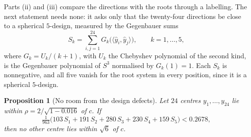 \documentclass[11pt,reqno]{amsart}
\renewcommand{\_}{\origunderscore\allowbreak}
\numberwithin{equation}{section}
\theoremstyle{plain}
\newtheorem{prop}[thm]{Proposition}
\theoremstyle{definition}
\theoremstyle{remark}
\begin{document}
Parts (ii) and (iii) compare the directions with the roots through a
labelling. The next statement needs none: it asks only that the twenty-four
directions be close to a spherical $5$-design, measured by the Gegenbauer
sums
\[
  S_k=\sum_{i,j=1}^{24}G_k\bigl(\langle\hat y_i,\hat y_j\rangle\bigr),\qquad
  k=1,\dots,5,
\]
where $G_k=U_k/(k+1)$, with $U_k$ the Chebyshev polynomial of the second kind,
is the Gegenbauer polynomial of $S^3$ normalised by $G_k(1)=1$. Each $S_k$ is
nonnegative, and all five vanish for the root system in every position,
since it is a spherical $5$-design.

\begin{prop}[No room from the design defects]\label{prop:design-budget}
Let $24$ centres $y_1,\dots,y_{24}$ lie within $\rho=2/\sqrt{1-0.016}$ of
$c$. If
\[
  \tfrac1{963}\bigl(103\,S_1+191\,S_2+280\,S_3+230\,S_4+159\,S_5\bigr)<0.2678,
\]
then no other centre lies within $\sqrt6$ of $c$.
\end{prop}
\end{document}
